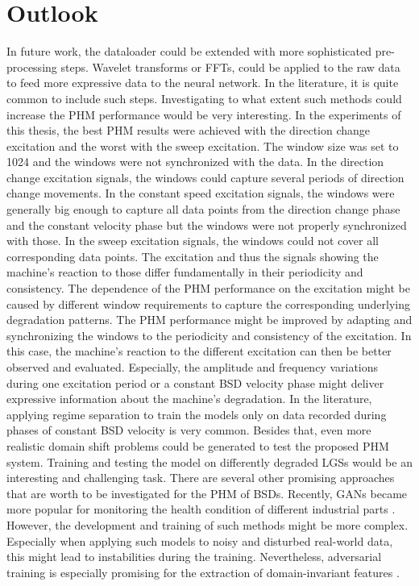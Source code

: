 \chapter{Outlook}
In future work, the dataloader could be extended with more sophisticated pre-processing steps. Wavelet transforms or FFTs, could be applied to the raw data to feed more expressive data to the neural network. In the literature, it is quite common to include such steps. Investigating to what extent such methods could increase the PHM performance would be very interesting.
In the experiments of this thesis, the best PHM results were achieved with the direction change excitation and the worst with the sweep excitation. The window size was set to 1024 and the windows were not synchronized with the data. In the direction change excitation signals, the windows could capture several periods of direction change movements. In the constant speed excitation signals, the windows were generally big enough to capture all data points from the direction change phase and the constant velocity phase but the windows were not properly synchronized with those. In the sweep excitation signals, the windows could not cover all corresponding data points. The excitation and thus the signals showing the machine's reaction to those differ fundamentally in their periodicity and consistency. The dependence of the PHM performance on the excitation might be caused by different window requirements to capture the corresponding underlying degradation patterns. The PHM performance might be improved by adapting and synchronizing the windows to the periodicity and consistency of the excitation. In this case, the machine's reaction to the different excitation can then be better observed and evaluated. Especially, the amplitude and frequency variations during one excitation period or a constant BSD velocity phase might deliver expressive information about the machine's degradation. In the literature, applying regime separation to train the models only on data recorded during phases of constant BSD velocity is very common.
Besides that, even more realistic domain shift problems could be generated to test the proposed PHM system. Training and testing the model on differently degraded LGSs would be an interesting and challenging task.
There are several other promising approaches that are worth to be investigated for the PHM of BSDs. Recently, GANs became more popular for monitoring the health condition of different industrial parts \cite{Zhang2019}. However, the development and training of such methods might be more complex. Especially when applying such models to noisy and disturbed real-world data, this might lead to instabilities during the training. Nevertheless, adversarial training is especially promising for the extraction of domain-invariant features \cite{Zhang2019}. 




